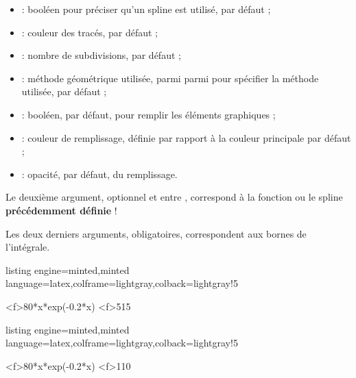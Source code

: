 \documentclass[11pt,a4paper]{ltxdoc}
\begin{document}
\begin{itemize}
	\item {} : booléen pour préciser qu'un spline est utilisé,  par défaut ;
	\item {} : couleur des tracés,  par défaut ;
	\item {} : nombre de subdivisions,  par défaut ;
	\item {} : méthode géométrique utilisée, parmi parmi  pour spécifier la méthode utilisée,  par défaut ;
	\item {} : booléen,  par défaut, pour remplir les éléments graphiques ;
	\item {} : couleur de remplissage, définie par rapport à la couleur principale par défaut ;
	\item {} : opacité,  par défaut, du remplissage.
\end{itemize}

\smallskip

Le deuxième argument, optionnel et entre , correspond à la fonction ou le spline \textbf{précédemment définie} !

\smallskip

Les deux derniers arguments, obligatoires, correspondent aux bornes de l'intégrale.

\begin{tcblisting}{listing engine=minted,minted language=latex,colframe=lightgray,colback=lightgray!5}
\begin{GraphiqueTikz}
	[x=0.66cm,y=0.033cm,Xmin=0,Xmax=21,Xgrille=2,Xgrilles=1,
	Ymin=0,Ymax=160,Ygrille=20,Ygrilles=10]
	{80*x*exp(-0.2*x)}
	{5}{15}
\end{GraphiqueTikz}
\end{tcblisting}

\begin{tcblisting}{listing engine=minted,minted language=latex,colframe=lightgray,colback=lightgray!5}
\begin{GraphiqueTikz}
	[x=0.66cm,y=0.033cm,Xmin=0,Xmax=21,Xgrille=2,Xgrilles=1,
	Ymin=0,Ymax=160,Ygrille=20,Ygrilles=10]
	{80*x*exp(-0.2*x)}
	\RepresenterMethodeIntegrale
		[Methode=RectanglesDroite,Couleur=orange,NbSubDiv=7]<f>{1}{10}
\end{GraphiqueTikz}
\end{tcblisting}
\end{document}
